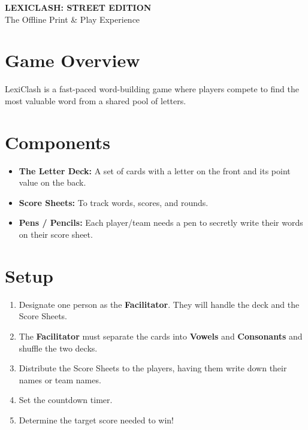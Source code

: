 \documentclass[a4paper,11pt]{article}
\begin{document}
	
	\thispagestyle{empty}
	\begin{center}
		{\Huge \textsf{\textbf{LEXICLASH: STREET EDITION}}} \\[0.3cm]
		{\Large \textsf{The Offline Print \& Play Experience}} \\[1cm]
	\end{center}
	
	\section*{Game Overview}
	LexiClash is a fast-paced word-building game where players compete to find the most valuable word from a shared pool of letters.
	
	\section*{Components}
	\begin{itemize}
		\item \textbf{The Letter Deck:} A set of cards with a letter on the front and its point value on the back.
		\item \textbf{Score Sheets:} To track words, scores, and rounds.
		\item \textbf{Pens / Pencils:} Each player/team needs a pen to secretly write their words on their score sheet.
	\end{itemize}
	
	\section*{Setup}
	\begin{enumerate}
		\item Designate one person as the \textbf{Facilitator}. They will handle the deck and the Score Sheets.
		\item The \textbf{Facilitator} must separate the cards into \textbf{Vowels} and \textbf{Consonants} and shuffle the two decks.
		\item Distribute the Score Sheets to the players, having them write down their names or team names.
		\item Set the countdown timer.
		\item Determine the target score needed to win!
	\end{enumerate}
	
\end{document}
